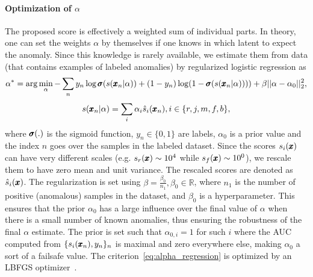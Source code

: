 \paragraph{Optimization of $\alpha$ } The proposed score is effectively a weighted sum of individual parts. In theory, one can set the weights $\alpha$ by themselves if one knows in which latent to expect the anomaly. Since this knowledge is rarely available, we estimate them from data (that contains examples of labeled anomalies) by regularized logistic regression as
\begin{equation} \label{eq:alpha_regression}
    \alpha^* = \arg \min_{\alpha} - \sum_n y_n \log \pmb{{\sigma}} (s(\pmb{{x}}_n\vert\alpha)) + (1-y_n) \log(1-\pmb{{\sigma}} (s(\pmb{{x}}_n\vert\alpha)))) + \beta \vert \vert \alpha - \alpha_0 \vert \vert^2_2 ,
\end{equation}
\begin{equation}
    s(\pmb{{x}}_n\vert\alpha) = \sum_i \alpha_i \hat{s}_i(\pmb{{x}}_n), i \in \lbrace r, j, m, f, b \rbrace,
\end{equation}
where $\pmb{{\sigma}}(.)$ is the sigmoid function, $y_n \in \lbrace 0,1 \rbrace$ are labels, $\alpha_0$ is a prior value and the index $n$ goes over the samples in the labeled dataset. Since the scores $s_i(\pmb{{x}})$ can have very different scales (e.g. $s_r(\pmb{{x}}) \sim 10^4$ while $s_f(\pmb{{x}}) \sim 10^0$), we rescale them to have zero mean and unit variance. The rescaled scores are denoted as $\hat{s}_i(\pmb{{x}})$. The regularization is set using $\beta = \frac{\beta_0}{n_1}, \beta_0 \in \mathbb{R}$, where $n_1$ is the number of positive (anomalous) samples in the dataset, and $\beta_0$ is a hyperparameter. This ensures that the prior $\alpha_0$ has a large influence over the final value of $\alpha$ when there is a small number of known anomalies, thus ensuring the robustness of the final $\alpha$ estimate. The prior is set such that $\alpha_{0,i}=1$ for such $i$ where the AUC computed from $\lbrace s_{i}(\pmb{{x}}_n), y_n \rbrace_n$ is maximal and zero everywhere else, making $\alpha_0$ a sort of a failsafe value. The criterion~\eqref{eq:alpha_regression} is optimized by an LBFGS optimizer~\cite{liu1989limited}.


